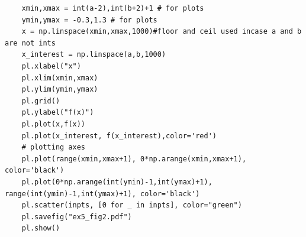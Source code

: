 \documentclass[a4paper,11pt]{article}
\begin{document}
{\begin{lstlisting}
    xmin,xmax = int(a-2),int(b+2)+1 # for plots
    ymin,ymax = -0.3,1.3 # for plots
    x = np.linspace(xmin,xmax,1000)#floor and ceil used incase a and b are not ints
    x_interest = np.linspace(a,b,1000)
    pl.xlabel("x")
    pl.xlim(xmin,xmax)
    pl.ylim(ymin,ymax)
    pl.grid()
    pl.ylabel("f(x)")
    pl.plot(x,f(x))
    pl.plot(x_interest, f(x_interest),color='red')
    # plotting axes
    pl.plot(range(xmin,xmax+1), 0*np.arange(xmin,xmax+1), color='black')
    pl.plot(0*np.arange(int(ymin)-1,int(ymax)+1), range(int(ymin)-1,int(ymax)+1), color='black')
    pl.scatter(inpts, [0 for _ in inpts], color="green")
    pl.savefig("ex5_fig2.pdf")
    pl.show()

\end{lstlisting}
}
\end{document}
